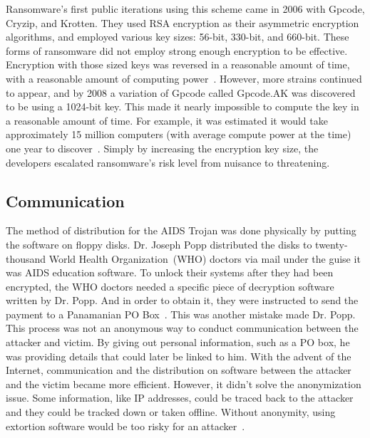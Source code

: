 \documentclass{IEEEtran}
\begin{document}
Ransomware's first public iterations using this scheme came in 2006 with Gpcode, Cryzip, and Krotten. They used RSA encryption as their asymmetric encryption algorithms, and employed various key sizes: 56-bit, 330-bit, and 660-bit. These forms of ransomware did not employ strong enough encryption to be effective. Encryption with those sized keys was reversed in a reasonable amount of time, with a reasonable amount of computing power~\cite{RN22}. However, more strains continued to appear, and by 2008 a variation of Gpcode called Gpcode.AK was discovered to be using a 1024-bit key. This made it nearly impossible to compute the key in a reasonable amount of time. For example, it was estimated it would take approximately 15 million computers (with average compute power at the time) one year to discover~\cite{RN21}. Simply by increasing the encryption key size, the developers escalated ransomware's risk level from nuisance to threatening.


\subsection{Communication}\label{communication}
The method of distribution for the AIDS Trojan was done physically by putting the software on floppy disks. Dr. Joseph Popp distributed the disks to twenty-thousand World Health Organization~(WHO) doctors via mail under the guise it was AIDS education software. To unlock their systems after they had been encrypted, the WHO doctors needed a specific piece of decryption software written by Dr. Popp. And in order to obtain it, they were instructed to send the payment to a Panamanian PO Box~\cite{RN40}. This was another mistake made Dr. Popp. This process was not an anonymous way to conduct communication between the attacker and victim. By giving out personal information, such as a PO box, he was providing details that could later be linked to him. With the advent of the Internet, communication and the distribution on software between the attacker and the victim became more efficient. However, it didn't solve the anonymization issue. Some information, like IP addresses, could be traced back to the attacker and they could be tracked down or taken offline. Without anonymity, using extortion software would be too risky for an attacker~\cite{RN33}.
\end{document}
